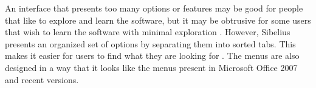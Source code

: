         
        An interface that presents too many options or features may be good for people that like to explore and learn the software, but it may be obtrusive for some users that wish to learn the software with minimal exploration \citep{galitz2007essential}. However, Sibelius presents an organized set of options by separating them into sorted tabs. This makes it easier for users to find what they are looking for \citep{hess2008sibeliusvsfinale}. The menus are also designed in a way that it looks like the menus present in Microsoft Office 2007 and recent versions.
        

